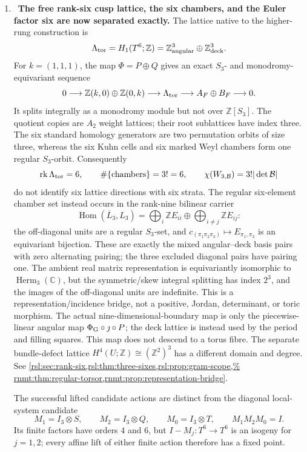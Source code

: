 \begin{enumerate}[leftmargin=1.8em,itemsep=.65em]
\item \Verified\ \textbf{The free rank-six cusp lattice, the six chambers,
and the Euler factor six are now separated exactly.}
The lattice native to the higher-rung construction is
\[
 \Lambda_{\rm tor}=H_1(T^6;\mathbb Z)
 =\mathbb Z^3_{\rm angular}\oplus\mathbb Z^3_{\rm deck}.
\]
For \(k=(1,1,1)\), the map \(\Phi=P\oplus Q\) gives an exact
\(S_3\)- and monodromy-equivariant sequence
\[
 0\longrightarrow\mathbb Z(k,0)\oplus\mathbb Z(0,k)
 \longrightarrow\Lambda_{\rm tor}
 \longrightarrow A_F\oplus B_F\longrightarrow0.
\]
It splits integrally as a monodromy module but not over
\(\mathbb Z[S_3]\).  The quotient copies are \(A_2\) weight lattices; their
root sublattices have index three.  The six standard homology generators are
two permutation orbits of size three, whereas the six Kuhn cells and six
marked Weyl chambers form one regular \(S_3\)-orbit.  Consequently
\[
 \operatorname{rk}\Lambda_{\rm tor}=6,\qquad
 \#\{\text{chambers}\}=3!=6,\qquad
 \chi(W_{3,\mathcal B})=3!|\det\mathcal B|
\]
do not identify six lattice directions with six strata.  The regular
six-element chamber set instead occurs in the rank-nine bilinear carrier
\[
 \operatorname{Hom}(\overline L_3,L_3)
 =\bigoplus_i\mathbb ZE_{ii}\oplus
  \bigoplus_{i\ne j}\mathbb ZE_{ij}:
\]
the off-diagonal units are a regular \(S_3\)-set, and
\(c_{(\pi_1\pi_2\pi_3)}\mapsto E_{\pi_1,\pi_3}\) is an equivariant
bijection.  These are exactly the mixed angular--deck basis pairs with zero
alternating pairing; the three excluded diagonal pairs have pairing one.
The ambient real matrix representation is equivariantly isomorphic to
\(\operatorname{Herm}_3(\mathbb C)\), but the symmetric/skew integral
splitting has index \(2^3\), and the images of the off-diagonal units are
indefinite.  This is a representation/incidence bridge, not a positive,
Jordan, determinant, or toric morphism.  The actual
nine-dimensional-boundary map is only the piecewise-linear angular map
\(\Phi_{\rm G}\circ\jmath\circ P\); the deck lattice is instead used by the
period and filling squares.  This map does not descend to a torus fibre.
The separate bundle-defect lattice \(H^4(U;\mathbb Z)\cong(\mathbb Z^2)^3\)
has a different domain and degree.  See
\cref{rsl:sec:rank-six,rsl:thm:three-sixes,rsl:prop:gram-scope,%
rnmt:thm:regular-torsor,rnmt:prop:representation-bridge}.

The successful lifted candidate actions are distinct from the diagonal
local-system candidate
\[
 M_1=I_3\otimes S,\qquad M_2=I_3\otimes Q,\qquad M_0=I_3\otimes T,
 \qquad M_1M_2M_0=I.
\]
Its finite factors have orders \(4\) and \(6\), but
\(I-M_j:T^6\to T^6\) is an isogeny for \(j=1,2\); every affine lift of
either finite action therefore has a fixed point.


\end{enumerate}
